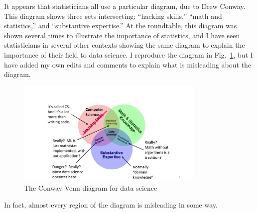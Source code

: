 \documentclass[11pt]{article}
\begin{document}
It appears that statisticians all use a particular diagram, due to Drew Conway.  This diagram shows three sets intersecting: ``hacking skills,'' ``math and statistics,'' and ``substantive expertise.''  At the roundtable, this diagram was shown several times to illustrate the importance of statistics, and I have seen statisticians in several other contexts showing the same diagram to explain the importance of their field to data science.  I reproduce the diagram in Fig.~\ref{drew-diagram-fig}, but I have added my own edits and comments to explain what is misleading about the diagram.

\begin{figure}[h]
\centerline{\includegraphics[width=0.8\textwidth]{letters/drew-diagram.pdf}}
\caption{The Conway Venn diagram for data science}
\label{drew-diagram-fig}
\end{figure}

In fact, almost every region of the diagram is misleading in some way.
\end{document}
